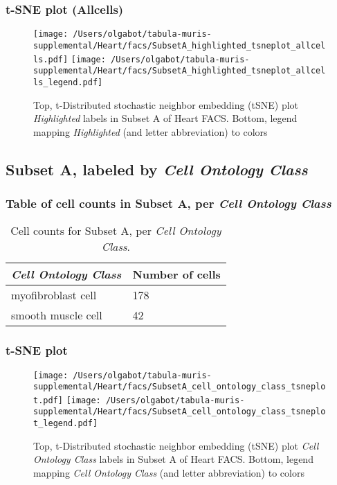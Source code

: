 \subsubsection{t-SNE plot (Allcells)}
\begin{figure}[h]
\centering
\texttt{[image: /Users/olgabot/tabula-muris-supplemental/Heart/facs/SubsetA\_highlighted\_tsneplot\_allcells.pdf]}
\texttt{[image: /Users/olgabot/tabula-muris-supplemental/Heart/facs/SubsetA\_highlighted\_tsneplot\_allcells\_legend.pdf]}
\caption{Top, t-Distributed stochastic neighbor embedding (tSNE) plot  \emph{Highlighted} labels in Subset A of Heart FACS. Bottom, legend mapping \emph{Highlighted} (and letter abbreviation) to colors}
\end{figure}


\clearpage

\subsection{Subset A, labeled by \emph{Cell Ontology Class}}
\subsubsection{Table of cell counts in Subset A, per \emph{Cell Ontology Class}}\begin{table}[h]
\centering
\label{my-label}
\begin{tabular}{@{}ll@{}}
\toprule

\emph{Cell Ontology Class}& Number of cells \\ \midrule
myofibroblast cell & 178 \\

smooth muscle cell & 42 \\
\bottomrule
\end{tabular}
\caption{Cell counts for Subset A, per \emph{Cell Ontology Class}.}
\end{table}

\clearpage
\subsubsection{t-SNE plot}
\begin{figure}[h]
\centering
\texttt{[image: /Users/olgabot/tabula-muris-supplemental/Heart/facs/SubsetA\_cell\_ontology\_class\_tsneplot.pdf]}
\texttt{[image: /Users/olgabot/tabula-muris-supplemental/Heart/facs/SubsetA\_cell\_ontology\_class\_tsneplot\_legend.pdf]}
\caption{Top, t-Distributed stochastic neighbor embedding (tSNE) plot  \emph{Cell Ontology Class} labels in Subset A of Heart FACS. Bottom, legend mapping \emph{Cell Ontology Class} (and letter abbreviation) to colors}
\end{figure}



